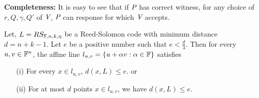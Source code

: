 \begin{comment}

\begin{figure}[htb!]
	\centering
	\begin{tikzpicture}
		\node[block] (P) {$\P$};
		\node[block, right of = P, xshift=7cm] (V) {$\V$};
		\draw[->](1,-1)-- node[yshift=0.5em]{$c$}(7,-1);
		\draw[->](7,-2)-- node[yshift=0.5em]{$r\in_R \mathbb{F}^p$}(1,-2);
		\node[below of=P, xshift=-1em, yshift=-3em]{$\widetilde{U}=\sum\limits_{i\in [p]}r_i U[i]$};
		\node[below of=P, xshift=-1em, yshift=-5em]{$\tilde{c}=com(\widetilde{U})$};
		\draw[->](1,-3.5)-- node[yshift=0.5em]{$\tilde{c}$}(7,-3.5);
		\draw[->](7,-4.5)-- node[yshift=0.5em]{$\gamma\in_R \mathbb{F}^m$}(1,-4.5);
		\node[below of=P, yshift=-16em]{$w=\gamma^T \widetilde{U}$};
		\draw[->](1,-5.5)-- node[yshift=0.6em]{$w$}(7,-5.5);
		\draw[->](7,-6.5)-- node[yshift=0.5em]{$Q\subset _R [n] : |Q|=t$}(1,-6.5);
		\draw[->](1,-7.5)-- node[yshift=0.6em]{$\widetilde{U}[k]$ with the randomness to commit it:$ k\in Q$}(7,-7.5);
		\draw[->](1,-7.5)-- node[yshift=-0.5em]{$C[k]: k \in Q$ and corresponding Merkle paths}(7,-7.5);
	\end{tikzpicture}
	\caption{Protocol for Testing Interleaved}
\end{figure}

$\P$ and $\V$ follows the protocol in Figure 1 and then
$\V$ checks the following:
\begin{itemize}
	\item[(a)] Validation of $C[k]$ with respect to $c$.
	\item[(b)] $\tilde{c}_k = \sum\limits_{i\in[p]} r_ic_{ik}$ $\forall k\in Q$
	\item[(c)] $w\in L$, $L$ is the set of codewords.
	\item[(d)] $\sum\limits_{j\in [m]} \gamma_j \widetilde{U}[j,k] = w_k$ $\forall k\in Q'$
	\item[(e)] $open(\tilde{c}_k) = \widetilde{U}[k]$ $\forall k\in Q'$
\end{itemize}
	content...
\end{comment}

\textbf{Completeness:} It is easy to see that if $\P$ has correct witness, for any choice of $r, Q, \gamma, Q'$ of $\V$, $\P$ can response for which $\V$ accepts.\\

 \begin{lemma}
 	Let, $L=RS_{\bbF, n, k, \eta}$ be a Reed-Solomon code with minimum distance $d=n+k-1$. Let $e$ be a positive number such that $e<\frac{d}{3}$. Then for every $u,v\in \bbF^n$, the affine line $l_{u,v}=\{u+\alpha v : \alpha \in \bbF\}$ satisfies
 	\begin{enumerate}
 		 \item[(i)] For every $x\in l_{u,v}$, $d(x,L)\leq e$. or
 		 \item[(ii)] For at most $d$ points $x\in l_{u,v}$, we have $d(x,L)\leq e$.
 	\end{enumerate} 
 \end{lemma}

